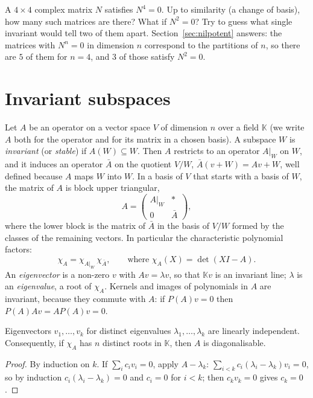 \begin{think}
A $4\times4$ complex matrix $N$ satisfies $N^4=0$. Up to similarity (a change of basis), how many such matrices are
there? What if $N^2=0$? Try to guess what single invariant would tell two of them apart. Section~\ref{sec:nilpotent}
answers: the matrices with $N^n=0$ in dimension $n$ correspond to the partitions of $n$, so there are $5$ of them for
$n=4$, and $3$ of those satisfy $N^2=0$.
\end{think}

\section{Invariant subspaces}

Let $A$ be an operator on a vector space $V$ of dimension $n$ over a field $\mathbb K$ (we write $A$ both for the
operator and for its matrix in a chosen basis). A subspace $W$ is \emph{invariant} (or \emph{stable}) if $A(W)\subseteq
W$. Then $A$ restricts to an operator $A|_W$ on $W$, and it induces an operator $\bar A$ on the quotient $V/W$,
$\bar A(v+W)=Av+W$, well defined because $A$ maps $W$ into $W$. In a basis of $V$ that starts with a basis of $W$, the
matrix of $A$ is block upper triangular,
\[
A=\begin{pmatrix}A|_W&*\\0&\bar A\end{pmatrix},
\]
where the lower block is the matrix of $\bar A$ in the basis of $V/W$ formed by the classes of the remaining vectors. In
particular the characteristic polynomial factors:
\begin{equation}\label{eq:charfactor}
\chi_A=\chi_{A|_W}\,\chi_{\bar A},\qquad\text{where }\chi_A(X)=\det(XI-A).
\end{equation}
An \emph{eigenvector} is a non-zero $v$ with $Av=\lambda v$, so that $\mathbb Kv$ is an invariant line; $\lambda$ is an
\emph{eigenvalue}, a root of $\chi_A$. Kernels and images of polynomials in $A$ are invariant, because they commute with
$A$: if $P(A)v=0$ then $P(A)Av=AP(A)v=0$.

\begin{proposition}\label{prop:indep}
Eigenvectors $v_1,\dots,v_k$ for distinct eigenvalues $\lambda_1,\dots,\lambda_k$ are linearly independent. Consequently,
if $\chi_A$ has $n$ distinct roots in $\mathbb K$, then $A$ is diagonalisable.
\end{proposition}
\begin{proof}
By induction on $k$. If $\sum_i c_iv_i=0$, apply $A-\lambda_k$: $\sum_{i<k}c_i(\lambda_i-\lambda_k)v_i=0$, so by
induction $c_i(\lambda_i-\lambda_k)=0$ and $c_i=0$ for $i<k$; then $c_kv_k=0$ gives $c_k=0$.
\end{proof}


